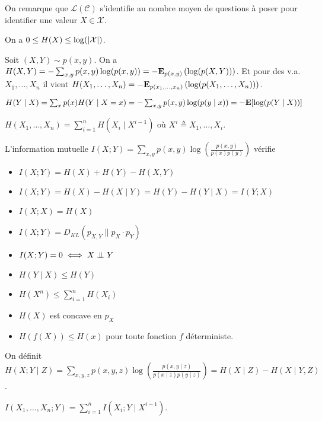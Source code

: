 On remarque que $\mathcal{L}(\mathcal{C})$ s'identifie au nombre moyen de questions à poser pour identifier une valeur $X \in \mathcal{X}$.

\begin{defn}
	[...]
\end{defn}

\begin{thm}
	On a $0 \leq H(X) \leq \log( \left\lvert\mathcal{X}\right\rvert )$.
\end{thm}

\begin{defn}
	Soit $(X,Y) \sim p(x,y)$.
	On a $H(X,Y) = - \sum_{x,y} p(x,y) \log(p(x,y)) = - \mathbf{E}_{p(x,y)} \left( \log (p(X,Y)) \right)$.
	Et pour des v.a. $X_1, \ldots, X_n$ il vient $H(X_1,\ldots,X_n) = - \mathbf{E}_{p(x_1,\ldots,x_n)} \left( \log( p(X_1,\ldots,X_n)) \right)$.
\end{defn}

\begin{defn}
	$H(Y \mid X)
		= \sum_x p(x) H(Y \mid X = x)
		= - \sum_{x,y} p(x,y) \log(p(y \mid x))
		= - \mathbf{E} [ \log(p(Y \mid X)) ]$
\end{defn}

\begin{thm}
	$H(X_1,\ldots,X_n) = \sum_{i = 1}^n H(X_i \mid X^{i - 1})$ où $X^i \triangleq X_1,\ldots,X_i$.
\end{thm}

\begin{pop}
	L'information mutuelle $I(X;Y) = \sum_{x,y} p(x,y) \log \left( \frac{p(x,y)}{p(x)p(y)} \right)$ vérifie
	\begin{itemize}
		\item[\textbullet] $I(X;Y) = H(X) + H(Y) - H(X,Y)$
		\item[\textbullet] $I(X;Y) = H(X) - H(X \mid Y) = H(Y) - H(Y \mid X) = I(Y;X)$
		\item[\textbullet] $I(X;X) = H(X)$
		\item[\textbullet] $I(X;Y) = D_{KL}( p_{X,Y} \| p_X \cdot p_Y )$
		\item[\textbullet] $I(X;Y) = 0 \iff X \indep Y$
		\item[\textbullet] $H(Y \mid X) \leq H(Y)$
		\item[\textbullet] $H(X^n) \leq \sum_{i = 1}^n H(X_i)$
		\item[\textbullet] $H(X)$ est concave en $p_X$
		\item[\textbullet] $H(f(X)) \leq H(x)$ pour toute fonction $f$ déterministe.
	\end{itemize}
\end{pop}

\begin{defn}
	On définit $H(X ; Y \mid Z) = \sum_{x,y,z} p(x,y,z) \log \left( \frac{p(x,y \mid z)}{p(x \mid z) p(y \mid z)} \right) = H(X \mid Z) - H(X \mid Y, Z)$.
\end{defn}

\begin{thm}
	$I(X_1,\ldots,X_n ; Y) = \sum_{i = 1}^n I(X_i ; Y \mid X^{i - 1})$.
\end{thm}

